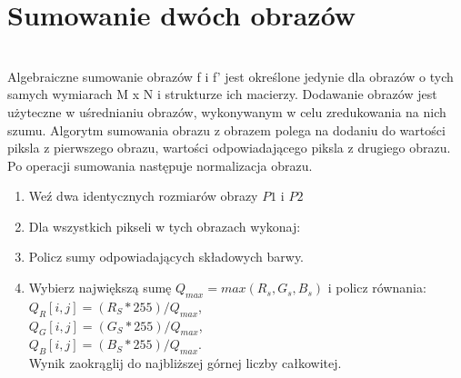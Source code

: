 \documentclass[final,a4paper,openany,12pt]{mwbk}
\begin{document}
\section {Sumowanie dwóch obrazów}
\hfill\\
\indent
Algebraiczne sumowanie obrazów f i f' jest określone jedynie dla obrazów o tych samych wymiarach M x N i strukturze ich macierzy.
Dodawanie obrazów jest użyteczne w uśrednianiu obrazów, wykonywanym w celu zredukowania na nich szumu.
Algorytm sumowania obrazu z obrazem polega na dodaniu do wartości piksla z pierwszego obrazu, wartości odpowiadającego piksla z drugiego obrazu.
Po operacji sumowania następuje normalizacja obrazu.

\begin{enumerate}	
		\item Weź dwa identycznych rozmiarów obrazy $P1$ i $P2$
		\item Dla wszystkich pikseli w tych obrazach wykonaj:
		\item Policz sumy odpowiadających składowych barwy.
		\item Wybierz największą sumę $Q_{max} = max(R_{s}, G_{s}, B_{s})$ i policz równania:\\
		$Q_{R}[i,j] = (R_{S} * 255)/Q_{max}$,\\
		$Q_{G}[i,j] = (G_{S} * 255)/Q_{max}$,\\
		$Q_{B}[i,j] = (B_{S} * 255)/Q_{max}$.\\
		Wynik zaokrąglij do najbliższej górnej liczby całkowitej.
	\end{enumerate}
\end{document}
